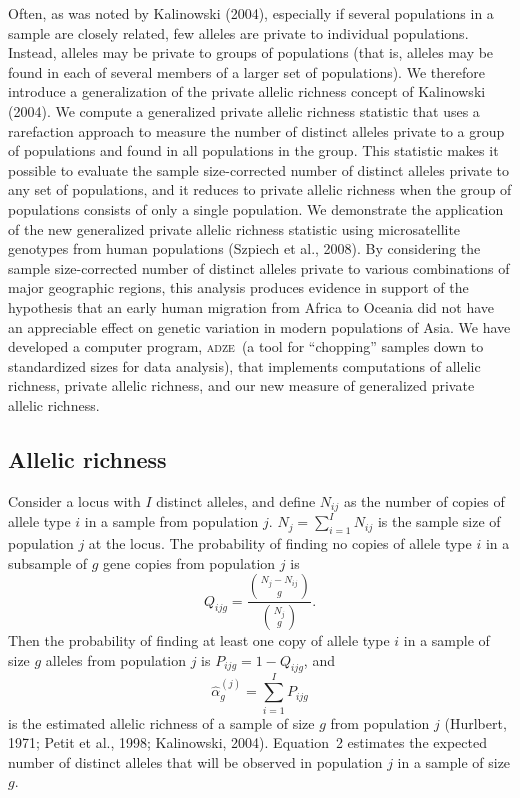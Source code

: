 \documentclass[11pt]{article}
\newcommand{\prog}{\textsc{adze}}
\begin{document}
Often, as was noted by Kalinowski (2004), especially if several populations in
a sample are closely related, few alleles are private to individual
populations. Instead, alleles may be private to groups of populations (that
is, alleles may be found in each of several members of a larger set of
populations). We therefore introduce a generalization of the private allelic
richness concept of Kalinowski (2004). We compute a generalized private
allelic richness statistic that uses a rarefaction approach to measure the
number of distinct alleles private to a group of populations and found in all
populations in the group. This statistic makes it possible to evaluate the
sample size-corrected number of distinct alleles private to any set of
populations, and it reduces to private allelic richness when the group of
populations consists of only a single population. We demonstrate the
application of the new generalized private allelic richness statistic using
microsatellite genotypes from human populations (Szpiech et al., 2008). By
considering the sample size-corrected number of distinct alleles private to
various combinations of major geographic regions, this analysis produces
evidence in support of the hypothesis that an early human migration from
Africa to Oceania did not have an appreciable effect on genetic variation in
modern populations of Asia. We have developed a computer program, \prog\ (a
tool for ``chopping'' samples down to standardized sizes for data analysis),
that implements computations of allelic richness, private allelic richness,
and our new measure of generalized private allelic richness.

\subsection{Allelic richness}

Consider a locus with $I$ distinct alleles, and define $N_{ij}$ as the number
of copies of allele type $i$ in a sample from population $j$.
$N_j = \sum_{i=1}^{I} N_{ij}$ is the sample size of population $j$ at the
locus. The probability of finding no copies of allele type $i$ in a subsample
of $g$ gene copies from population $j$ is
\begin{equation}
  Q_{ijg} = \frac{\binom{N_j - N_{ij}}{g}}{\binom{N_j}{g}}.
\end{equation}
Then the probability of finding at least one copy of allele type $i$ in a
sample of size $g$ alleles from population $j$ is $P_{ijg} = 1 - Q_{ijg}$, and
\begin{equation}
  \hat{\alpha}_g^{(j)} = \sum_{i=1}^{I} P_{ijg}
\end{equation}
is the estimated allelic richness of a sample of size $g$ from population $j$
(Hurlbert, 1971; Petit et al., 1998; Kalinowski, 2004). Equation~2 estimates
the expected number of distinct alleles that will be observed in population
$j$ in a sample of size $g$.
\end{document}
